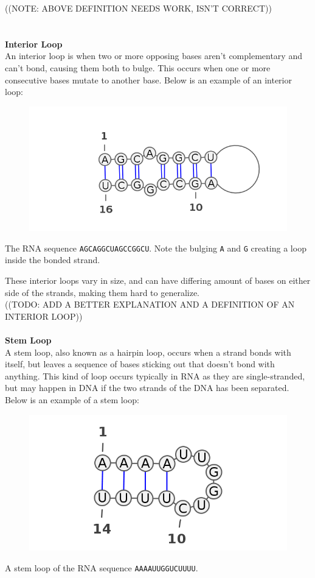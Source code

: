 ((NOTE: ABOVE DEFINITION NEEDS WORK, ISN'T CORRECT))\\
\\\\
\textbf{Interior Loop}\\
An interior loop is when two or more opposing bases aren't complementary and 
can't bond, causing them both to bulge. This occurs when one or more 
consecutive bases mutate to another base. Below is an example of an interior 
loop:
\begin{myex}\centering
\begin{figure}[h]
\includegraphics[scale=0.5]{./lib/interior-loop.png}
\end{figure}
The RNA sequence {\tt AGCAGGCUAGCCGGCU}. Note the bulging {\tt A} and {\tt G} 
creating a loop inside the bonded strand.
\end{myex}
These interior loops vary in size, and can have differing amount of bases on 
either side of the strands, making them hard to generalize.\\
((TODO: ADD A BETTER EXPLANATION AND A DEFINITION OF AN INTERIOR LOOP))
\\\\
\textbf{Stem Loop}\\
A stem loop, also known as a hairpin loop, occurs when a strand bonds with 
itself, but leaves a sequence of bases sticking out that doesn't bond with anything. 
This kind of loop occurs typically in RNA as they are single-stranded, but may 
happen in DNA if the two strands of the DNA has been separated. Below is an 
example of a stem loop:
\begin{myex}\centering
\begin{figure}[h]
\includegraphics[scale=0.5]{./lib/stem-loop.png}
\end{figure}
A stem loop of the RNA sequence {\tt AAAAUUGGUCUUUU}.
\end{myex}
